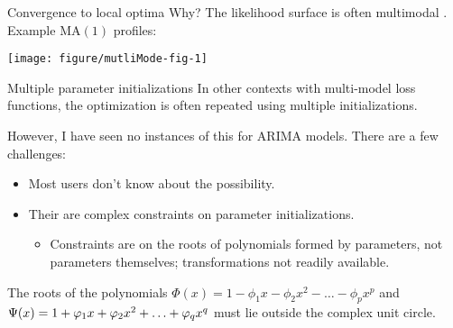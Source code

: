 \documentclass[aspectratio=169]{beamer}\usepackage[]{graphicx}\usepackage[]{xcolor}
\makeatletter
\def\maxwidth{ %
  \ifdim\Gin@nat@width>\linewidth
    \linewidth
  \else
    \Gin@nat@width
  \fi
}
\newenvironment{knitrout}{}{} %
\makeatother
\begin{document}
\begin{frame}{Convergence to local optima}
  Why? The likelihood surface is often multimodal \citep{ripley2002}. Example $\mathrm{MA}(1)$ profiles:


  
\begin{knitrout}
\color{fgcolor}

{\centering \texttt{[image: figure/mutliMode-fig-1]} 

}


\end{knitrout}

\end{frame}

\begin{frame}{Multiple parameter initializations}
  In other contexts with multi-model loss functions, the optimization is often repeated using multiple initializations.
  
  However, I have seen \alert{no instances} of this for $\mathrm{ARIMA}$ models. There are a few challenges: 
  \begin{itemize}
    \item Most users don't know about the possibility. 
    \item Their are complex constraints on parameter initializations. 
    \begin{itemize}
      \item Constraints are on the roots of polynomials formed by parameters, not parameters themselves; transformations not readily available.
    \end{itemize}
  \end{itemize}
  \pause
  The roots of the polynomials $\Phi(x) = 1 - \phi_1 x - \phi_2x^2 - \ldots - \phi_px^p$ and $\Psi(x) = 1 + \varphi_1 x + \varphi_2x^2 + \ldots + \varphi_qx^q$ must lie outside the complex unit circle.
\end{frame}
\end{document}
